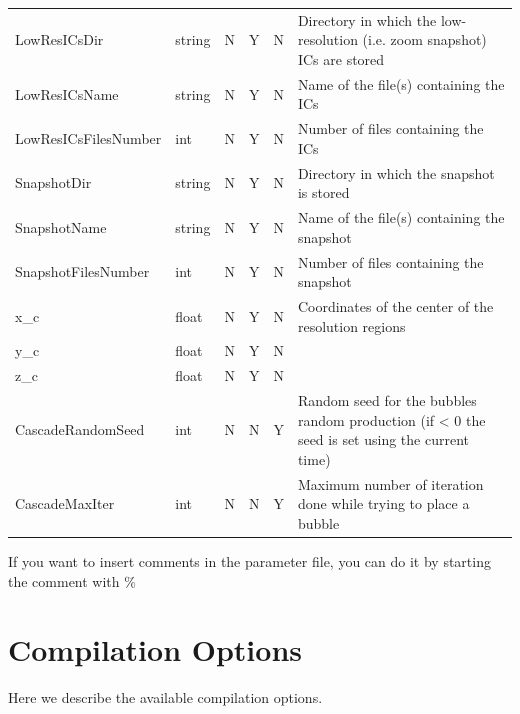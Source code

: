 \documentclass[11pt,a4paper,titlepage]{article}
\begin{document}
\begin{longtable}{l|l|c|c|c|p{4.3cm}}
LowResICsDir               &  string      & N & Y & N &  Directory in which the low-resolution (i.e. zoom snapshot) ICs are stored \\
LowResICsName              &  string      & N & Y & N &  Name of the file(s) containing the ICs \\
LowResICsFilesNumber       &  int         & N & Y & N &  Number of files containing the ICs \\
SnapshotDir                &  string      & N & Y & N &  Directory in which the snapshot is stored \\
SnapshotName               &  string      & N & Y & N &  Name of the file(s) containing the snapshot \\
SnapshotFilesNumber        &  int         & N & Y & N &  Number of files containing the snapshot \\
x\_c                       &  float       & N & Y & N &  Coordinates of the center of the resolution regions \\
y\_c                       &  float       & N & Y & N & \\
z\_c                       &  float       & N & Y & N & \\
CascadeRandomSeed          &  int         & N & N & Y &  Random seed for the bubbles random production (if < 0 the seed is set using the current time)\\
CascadeMaxIter             &  int         & N & N & Y &  Maximum number of iteration done while trying to place a bubble\\

\hline

\end{longtable}

If you want to insert comments in the parameter file, you can do it by starting the comment with \%

\section{Compilation Options}
Here we describe the available compilation options.
\end{document}
